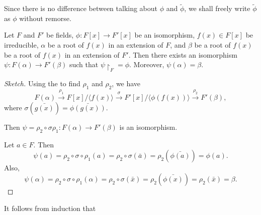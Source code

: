 \documentclass[notoc,notitlepage,nobib]{tufte-book}
\begin{document}
\begin{note}
  Since there is no difference between talking about $\phi$ and $\tilde{\phi}$, we shall
  freely write $\tilde{\phi}$ as $\phi$ without remorse.
\end{note}

\begin{lemma}\label{lemma:isomorphism_extension_lemma}
  Let $F$ and $F'$ be fields, $\phi : F[x] \to F'[x]$ be an isomorphism, $f(x) \in F[x]$ be
  irreducible, $\alpha$ be a root of $f(x)$ in an extension of $F$, and $\beta$ be a root of
  $f(x)$ be a root of $f(x)$ in an extension of $F'$. Then there exists an isomorphism
  $\psi : F(\alpha) \to F'(\beta)$ such that $\psi \restriction_F = \phi$. Moreover,
  $\psi(\alpha) = \beta$.
\end{lemma}

\begin{proof}[Sketch]
  Using the  to find $\rho_1$ and $\rho_2$, we have
  \begin{equation*}
    F(\alpha) \overset{\rho_1}{\to} F[x] \Big/ \langle f(x) \rangle \overset{\sigma}{\to}
    F'[x] \Big/ \langle \phi(f(x)) \rangle \overset{\rho_2}{\to} F'(\beta),
  \end{equation*}
   where $\sigma(\bar{g(x)}) = \bar{\phi(g(x))}$. 
  
  Then $\psi = \rho_2 \circ \sigma \rho_1 : F(\alpha) \to F'(\beta)$ is an isomorphism.

  Let $a \in F$. Then
  \begin{equation*}
    \psi(a) = \rho_2 \circ \sigma \circ \rho_1 (a) = \rho_2 \circ \sigma(\bar{a}) 
      = \rho_2(\bar{\phi(a)}) = \phi(a).
  \end{equation*}
  Also,
  \begin{equation*}
    \psi(\alpha) = \rho_2 \circ \sigma \circ \rho_1(\alpha) = \rho_2 \circ \sigma(\bar{x}) 
      = \rho_2(\bar{\phi(x)}) = \rho_2(\bar{x}) = \beta.
  \end{equation*}
\end{proof}

It follows from induction that
\end{document}
